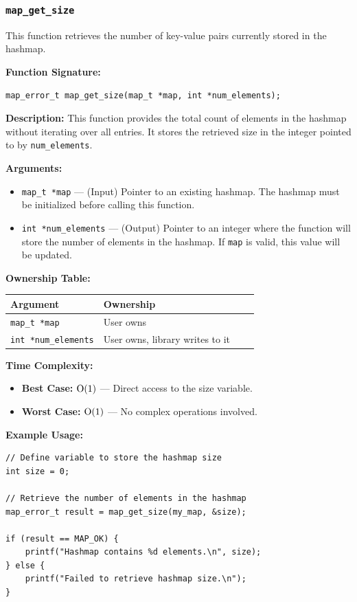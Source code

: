 \documentclass[titlepage]{article}
\begin{document}
\subsubsection{\texttt{map\_get\_size}} %

This function retrieves the number of key-value pairs currently stored in the hashmap.

\textbf{Function Signature:}
\begin{verbatim}
map_error_t map_get_size(map_t *map, int *num_elements);
\end{verbatim}

\textbf{Description:}
This function provides the total count of elements in the hashmap without iterating over all entries.
It stores the retrieved size in the integer pointed to by \texttt{num\_elements}.

\textbf{Arguments:}
\begin{itemize}
    \item \texttt{map\_t *map} --- (Input) Pointer to an existing hashmap.
    The hashmap must be initialized before calling this function.

    \item \texttt{int *num\_elements} --- (Output) Pointer to an integer where the function will store the number of elements in the hashmap.
    If \texttt{map} is valid, this value will be updated.
\end{itemize}

\textbf{Ownership Table:}
\begin{center}
\begin{tabular}{@{} l l c c @{} }
\toprule
\textbf{Argument} & \textbf{Ownership}  \\
\midrule
\texttt{map\_t *map} & User owns  \\
\texttt{int *num\_elements} & User owns, library writes to it \\
\bottomrule
\end{tabular}
\end{center}

\textbf{Time Complexity:}
\begin{itemize}
    \item \textbf{Best Case:} \( $O(1)$ \) --- Direct access to the size variable.
    \item \textbf{Worst Case:} \( $O(1)$ \) --- No complex operations involved.
\end{itemize}

\textbf{Example Usage:}
\begin{verbatim}
// Define variable to store the hashmap size
int size = 0;

// Retrieve the number of elements in the hashmap
map_error_t result = map_get_size(my_map, &size);

if (result == MAP_OK) {
    printf("Hashmap contains %d elements.\n", size);
} else {
    printf("Failed to retrieve hashmap size.\n");
}
\end{verbatim}
\end{document}
